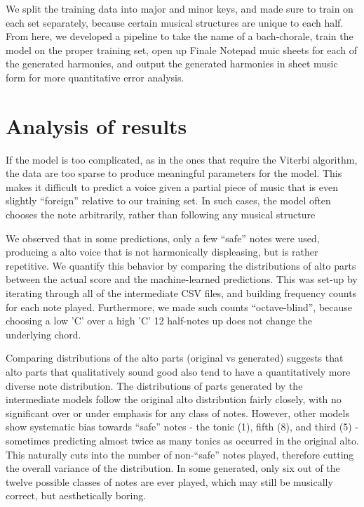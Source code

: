 \documentclass[11pt]{article}
\begin{document}
We split the training data into major and minor keys, and made sure to train on each set separately, because certain musical structures are unique to each half. From here, we developed a pipeline to take the name of a bach-chorale, train the model on the proper training set, open up Finale Notepad muic sheets for each of the generated harmonies, and output the generated harmonies in sheet music form for more quantitative error analysis. 

\section{Analysis of results}

If the model is too complicated, as in the ones that require the Viterbi algorithm, the data are too sparse to produce meaningful parameters for the model. This makes it difficult to predict a voice given a partial piece of music that is even slightly ``foreign'' relative to our training set. In such cases, the model often chooses the note arbitrarily, rather than following any musical structure 

We observed that in some predictions, only a few ``safe'' notes were used, producing a alto voice that is not harmonically displeasing, but is rather repetitive. We quantify this behavior by comparing the distributions of alto parts between the actual score and the machine-learned predictions. This was set-up by iterating through all of the intermediate CSV files, and building frequency counts for each note played. Furthermore, we made such counts ``octave-blind'', because choosing a low 'C' over a high 'C' 12 half-notes up does not change the underlying chord. 

Comparing distributions of the alto parts (original vs generated) suggests that alto parts that qualitatively sound good also tend to have a quantitatively more diverse note distribution. The distributions of parts generated by the intermediate models follow the original alto distribution fairly closely, with no significant over or under emphasis for any class of notes. However, other models show systematic bias towards ``safe'' notes - the tonic (1), fifth (8), and third (5) - sometimes predicting almost twice as many tonics as occurred in the original alto. This naturally cuts into the number of non-``safe'' notes played, therefore cutting the overall variance of the distribution. In some generated, only six out of the twelve possible classes of notes are ever played, which may still be musically correct, but aesthetically boring. 
\end{document}
